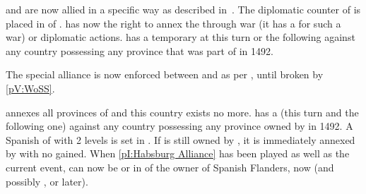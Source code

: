 


\phevnt
\aparag \SPA and \HAB are now allied in a specific way as described
in~.  The diplomatic counter of
\HAB is placed in \EG of \SPA.
\aparag \SPA has now the right to annex the \paysprovincesne through war (it
has a \CB for such a war) or diplomatic actions.
\aparag \SPA has a temporary \CB at this turn or the following against any
country possessing any province that was part of \paysBourgogne in 1492.

\effetlong
{} The special alliance is now enforced between \SPA and
\HAB as per , until broken by
\ref{pV:WoSS}.






\phevnt
\aparag \SPA annexes all provinces of \paysBourgogne and this country exists
no more.  \SPA has a \CB (this turn and the following one) against any country
possessing any province owned by \paysBourgogne in 1492.
\aparag A Spanish \MNU of  with 2 levels is set in
\provinceVlaandern.
\aparag If \provinceZeeland is still owned by , it is
immediately annexed by \HIS with no \VPs gained.
\aparag When \ref{pI:Habsburg Alliance} has been played as well as the current
event, \paysLiege can now be \VASSAL or in \ANNEXION of the owner of Spanish
Flanders, \SPA now (and possibly \FRA, \ENG or \AUS later).

